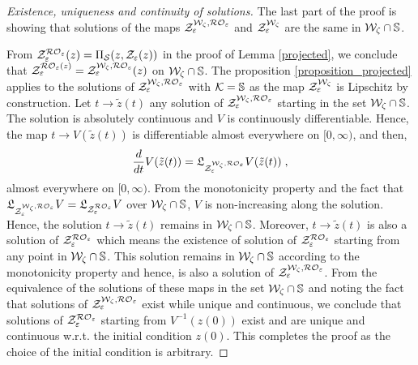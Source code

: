 \documentclass[journal,twoside,web]{ieeecolor}
\begin{document}
\begin{proof} [Existence, uniqueness and continuity of solutions]
The last part of the proof is showing that solutions of the maps ${\cal Z}_\varepsilon^{{\cal W}_\zeta, {\cal RO}_\varepsilon}$ and ${\cal Z}_\varepsilon^{{\cal W}_\zeta}$ are the same in ${\cal W}_\zeta \cap \mathbb S$\;.

From ${\cal Z}_\varepsilon^{{\cal RO}_\varepsilon}(z)=\Pi_{\mathcal S}(z,{\cal Z}_\varepsilon(z))$ in the proof of Lemma \ref{projected}, we conclude that ${\cal Z}_\varepsilon^{{\cal RO}_\varepsilon(z)}={\cal Z}_\varepsilon^{{\cal W}_\zeta, {\cal RO}_\varepsilon}(z)$ on ${\cal W}_\zeta \cap \mathbb S$\;. The proposition \ref{proposition_projected} applies to the solutions of ${\cal Z}_\varepsilon^{{\cal W}_\zeta,{\cal RO}_\varepsilon}$ with ${\cal K}=\mathbb S$ as the map ${\cal Z}_\varepsilon^{{\cal W}_\zeta}$ is Lipschitz by construction. Let $t \rightarrow \tilde z(t)$ any solution of ${\cal Z}_\varepsilon^{{\cal W}_\zeta,{\cal RO}_\varepsilon}$ starting in the set ${\cal W}_\zeta \cap \mathbb S$\;. The solution is absolutely continuous and $V$ is continuously differentiable. Hence, the map $t \rightarrow V(\tilde z(t))$ is differentiable almost everywhere on $[0,\infty)$, and then,
\begin{align*}
\frac{d}{dt}V(\tilde z(t))=\mathfrak{L}_{{\cal Z}_\varepsilon^{{\cal W}_\zeta,{\cal RO}_\varepsilon}} V(\tilde z(t))\;,
\end{align*}
almost everywhere on $[0,\infty)$. From the monotonicity property and the fact that $\mathfrak{L}_{{\cal Z}_\varepsilon^{{\cal W}_\zeta,{\cal RO}_\varepsilon}} V=\mathfrak{L}_{{\cal Z}_\varepsilon^{{\cal RO}_\varepsilon}} V$ over ${\cal W}_\zeta \cap \mathbb S$, $V$ is non-increasing along the solution. Hence, the solution $t \rightarrow \tilde z(t)$ remains in ${\cal W}_\zeta \cap \mathbb S$. Moreover, $t \rightarrow \tilde z(t)$ is also a solution of ${\cal Z}_\varepsilon^{{\cal RO}_\varepsilon}$ which means the existence of solution of ${\cal Z}_\varepsilon^{{\cal RO}_\varepsilon}$ starting from any point in ${\cal W}_\zeta \cap \mathbb S$. This solution remains in ${\cal W}_\zeta \cap \mathbb S$ according to the monotonicity property and hence, is also a solution of ${\cal Z}_\varepsilon^{{\cal W}_\zeta,{\cal RO}_\varepsilon}$. From the equivalence of the solutions of these maps in the set ${\cal W}_\zeta \cap \mathbb S$ and noting the fact that solutions of ${\cal Z}_\varepsilon^{{\cal W}_\zeta,{\cal RO}_\varepsilon}$ exist while unique and continuous, we conclude that solutions of ${\cal Z}_\varepsilon^{{\cal RO}_\varepsilon}$ starting from $V^{-1}(z(0))$ exist and are unique and continuous w.r.t. the initial condition $z(0)$. This completes the proof as the choice of the initial condition is arbitrary.
\end{proof}
\fi
\iffalse
\end{document}

